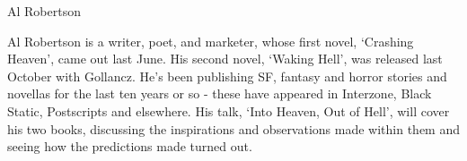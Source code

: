 {\Large Al Robertson}

\begin{figure}
	\vspace{-10mm}
	\vspace{-10mm}
\end{figure}

Al Robertson is a writer, poet, and marketer, whose first novel, `Crashing Heaven', came out last June. His second novel, `Waking Hell’, was released last October with Gollancz. He's been publishing SF, fantasy and horror stories and novellas for the last ten years or so - these have appeared in Interzone, Black Static, Postscripts and elsewhere.  His talk, `Into Heaven, Out of Hell’, will cover his two books, discussing the inspirations and observations made within them and seeing how the predictions made turned out.  
